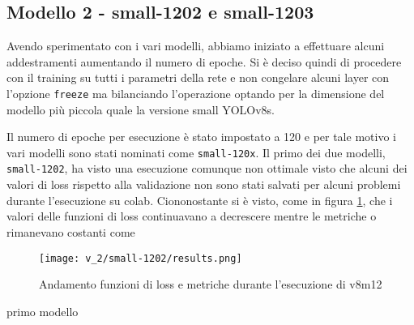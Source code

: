 \subsection*{Modello 2 - small-1202 e small-1203}

Avendo sperimentato con i vari modelli, abbiamo iniziato a effettuare alcuni addestramenti aumentando il
numero di epoche. Si è deciso quindi di procedere con il training su tutti i parametri della rete e non
congelare alcuni layer con l'opzione \verb|freeze| ma bilanciando l'operazione optando per la dimensione
del modello più piccola quale la versione small YOLOv8s. 

Il numero di epoche per esecuzione è stato impostato a 120 e per tale motivo i vari modelli sono stati
nominati come \verb|small-120x|. Il primo dei due modelli, \verb|small-1202|, ha visto una esecuzione 
comunque non ottimale visto che alcuni dei valori di loss rispetto alla validazione non sono stati 
salvati per alcuni problemi durante l'esecuzione su colab. Ciononostante si è visto, come in figura
\ref*{fig:v2-1}, che i valori delle funzioni di loss continuavano a decrescere mentre le metriche
o rimanevano costanti come 

\begin{figure}[h]
    \centering
    \texttt{[image: v\_2/small-1202/results.png]}
    \caption{Andamento funzioni di loss e metriche durante l'esecuzione di v8m12}
    \label{fig:v2-1}
\end{figure}




primo modello